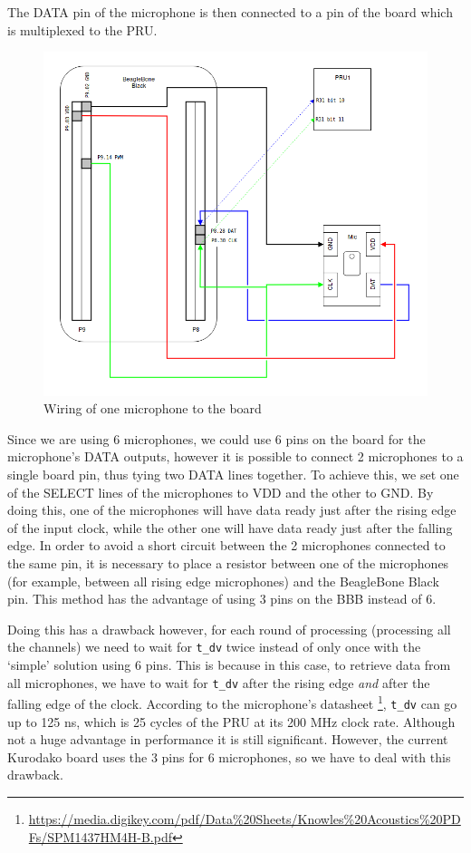 \documentclass[]{report}
\begin{document}
The DATA pin of the microphone is then connected to a pin of the board which is multiplexed to the PRU.

\begin{figure}[H]
\centering
\includegraphics[width=0.6\linewidth]{Pictures/wiring.png}
\caption{Wiring of one microphone to the board}
\end{figure}

Since we are using 6 microphones, we could use 6 pins on the board for the microphone's DATA outputs, however it is possible to connect 2 microphones to a single board pin, thus tying two DATA lines together. To achieve this, we set one of the SELECT lines of the microphones to VDD and the other to GND. By doing this, one of the microphones will have data ready just after the rising edge of the input clock, while the other one will have data ready just after the falling edge. In order to avoid a short circuit between the 2 microphones connected to the same pin, it is necessary to place a resistor between one of the microphones (for example, between all rising edge microphones) and the BeagleBone Black pin. This method has the advantage of using 3 pins on the BBB instead of 6.

Doing this has a drawback however, for each round of processing (processing all the channels) we need to wait for \texttt{t\_dv} twice instead of only once with the `simple' solution using 6 pins. This is because in this case, to retrieve data from all microphones, we have to wait for \texttt{t\_dv} after the rising edge \emph{and} after the falling edge of the clock. According to the microphone's datasheet \footnote{\url{https://media.digikey.com/pdf/Data\%20Sheets/Knowles\%20Acoustics\%20PDFs/SPM1437HM4H-B.pdf}}, \texttt{t\_dv} can go up to 125 ns, which is 25 cycles of the PRU at its 200 MHz clock rate. Although not a huge advantage in performance it is still significant. However, the current Kurodako board uses the 3 pins for 6 microphones, so we have to deal with this drawback.
\end{document}
